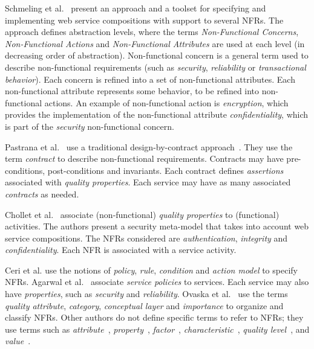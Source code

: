  
Schmeling et al.~\cite{SchmelingCM11} present an approach and a toolset for specifying and implementing web service compositions with support to several NFRs. 
The approach defines abstraction levels, where the terms \textit{Non-Functional Concerns}, \textit{Non-Functional Actions} and \textit{Non-Functional Attributes} are used at each level (in decreasing order of abstraction).
Non-functional concern is a general term used to describe non-functional requirements (such as  \textit{security}, \textit{reliability} or \textit{transactional behavior}). 
Each concern is refined into a set of non-functional attributes.  
Each non-functional attribute represents some behavior, to be refined into non-functional actions. 
An example of non-functional action is \textit{encryption}, which provides the implementation of the non-functional attribute \textit{confidentiality}, which is part of the \textit{security} non-functional concern. 

Pastrana et al.~\cite{PastranaPK11} use a traditional design-by-contract approach~\cite{Meyer97}.
They use the term \textit{contract} to describe non-functional requirements. 
Contracts may have pre-conditions, post-conditions and invariants. 
Each contract defines \textit{assertions} associated with \textit{quality properties}. 
Each service may have as many associated \textit{contracts} as needed.

Chollet et al.~\cite{CholletL09} associate (non-functional) \textit{quality properties} to 
(functional) activities. 
The authors present a security meta-model that takes into account web service compositions. 
The NFRs considered are \textit{authentication}, \textit{integrity} and \textit{confidentiality}. 
Each NFR is associated with a service activity.


Ceri et al.\cite{CeriDMF07} use the notions of \textit{policy}, \textit{rule}, \textit{condition} and \textit{action model} to specify NFRs.
Agarwal et al.~\cite{AgarwalLS09} associate \textit{service policies} to services. 
Each service may also have \textit{properties}, such as \textit{security} and \textit{reliability}. 
Ovaska et al.~\cite{OvaskaEHPA10} use the terms \textit{quality attribute}, \textit{category}, \textit{conceptual layer} and \textit{importance} to organize and classify NFRs.
Other authors do not define specific terms to refer to NFRs; they use terms such as \textit{attribute}~\cite{ZhangPSP05,BasinDL06,JeongCL09}, 
\textit{property}~\cite{Fabra2011}, 
\textit{factor}~\cite{MohantyRP10,GutierrezRF10}, 
\textit{characteristic}~\cite{DiamadopoulouMPS08}, 
\textit{quality level}~\cite{ModicaTV09}, and
\textit{value}~\cite{ThissenW06,BasinDL06}.


